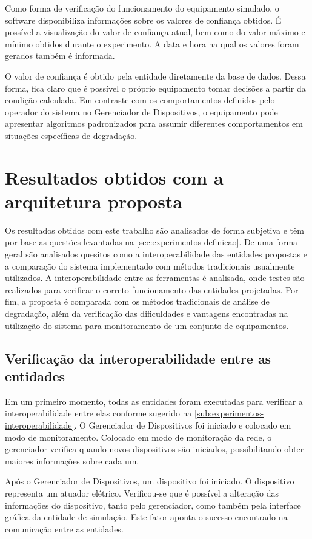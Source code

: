 Como forma de verificação do funcionamento do equipamento simulado, o software disponibiliza
informações sobre os valores de confiança obtidos. É possível a visualização do valor de confiança
atual, bem como do valor máximo e mínimo obtidos durante o experimento. A data e hora na qual os
valores foram gerados também é informada.

O valor de confiança é obtido pela entidade diretamente da base de dados. Dessa forma, fica claro
que é possível o próprio equipamento tomar decisões a partir da condição calculada. Em contraste com
os comportamentos definidos pelo operador do sistema no Gerenciador de Dispositivos, o equipamento
pode apresentar algoritmos padronizados para assumir diferentes comportamentos em situações
específicas de degradação.


\section{Resultados obtidos com a arquitetura proposta}

Os resultados obtidos com este trabalho são analisados de forma subjetiva e têm por base as questões
levantadas na \cref{sec:experimentos-definicao}. De uma forma geral são analisados quesitos como a
interoperabilidade das entidades propostas e a comparação do sistema implementado com métodos
tradicionais usualmente utilizados. A interoperabilidade entre as ferramentas é analisada, onde
testes são realizados para verificar o correto funcionamento das entidades projetadas. Por fim, a
proposta é comparada com os métodos tradicionais de análise de degradação, além da verificação das
dificuldades e vantagens encontradas na utilização do sistema para monitoramento de um conjunto de
equipamentos.


\subsection{Verificação da interoperabilidade entre as entidades}

Em um primeiro momento, todas as entidades foram executadas para verificar a interoperabilidade
entre elas conforme sugerido na \cref{sub:experimentos-interoperabilidade}. O Gerenciador de
Dispositivos foi iniciado e colocado em modo de monitoramento. Colocado em modo de monitoração da
rede, o gerenciador verifica quando novos dispositivos são iniciados, possibilitando obter maiores
informações sobre cada um.

Após o Gerenciador de Dispositivos, um dispositivo foi iniciado. O dispositivo representa um atuador
elétrico. Verificou-se que é possível a alteração das informações do dispositivo, tanto pelo
gerenciador, como também pela interface gráfica da entidade de simulação. Este fator aponta o
sucesso encontrado na comunicação entre as entidades.

